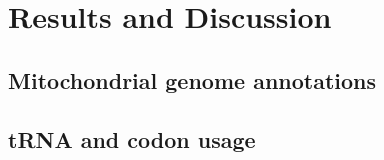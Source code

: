 \documentclass[../main.tex]{subfiles}
\begin{document}
\section{Results and Discussion}

\subsection{Mitochondrial genome annotations}
\subsection{tRNA and codon usage}
\end{document}

